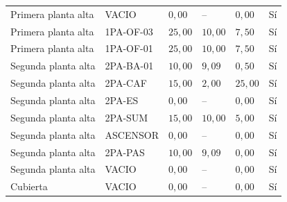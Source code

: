 {\begin{longtable}{p{2.8cm}p{2.2cm}p{1.7cm}p{1.7cm}p{1.7cm}p{1.5cm}}
  Primera planta alta & VACIO & $0,00$ & -- & $0,00$ & Sí \\
  Primera planta alta & 1PA-OF-03 & $25,00$ & $10,00$ & $7,50$ & Sí \\
  Primera planta alta & 1PA-OF-01 & $25,00$ & $10,00$ & $7,50$ & Sí \\
  Segunda planta alta & 2PA-BA-01 & $10,00$ & $9,09$ & $0,50$ & Sí \\
  Segunda planta alta & 2PA-CAF & $15,00$ & $2,00$ & $25,00$ & Sí \\
  Segunda planta alta & 2PA-ES & $0,00$ & -- & $0,00$ & Sí \\
  Segunda planta alta & 2PA-SUM & $15,00$ & $10,00$ & $5,00$ & Sí \\
  Segunda planta alta & ASCENSOR & $0,00$ & -- & $0,00$ & Sí \\
  Segunda planta alta & 2PA-PAS & $10,00$ & $9,09$ & $0,00$ & Sí \\
  Segunda planta alta & VACIO & $0,00$ & -- & $0,00$ & Sí \\
  Cubierta & VACIO & $0,00$ & -- & $0,00$ & Sí \\
\end{longtable}
}
